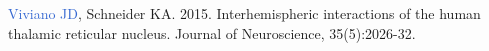 \documentclass[a4paper,11pt,oneside]{book}
\newcommand\paper[1]{
    #1\\
    \vspace{4.5mm}
}
\begin{document}
\begin{flushleft}
\paper{\textcolor{highlight}{Viviano JD}, Schneider KA. 2015. Interhemispheric interactions of the human thalamic reticular nucleus. Journal of Neuroscience, 35(5):2026-32.}









\end{flushleft}
\end{document}
